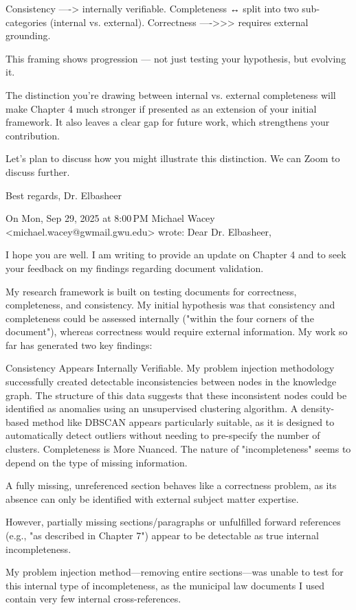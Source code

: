 Consistency ---->  internally verifiable.
Completeness ↔ split into two sub-categories (internal vs. external).
Correctness ---->>> requires external grounding.

This framing shows progression — not just testing your hypothesis, but evolving it.

The distinction you’re drawing between internal vs. external completeness will make Chapter 4 much stronger if presented as an extension of your initial framework. It also leaves a clear gap for future work, which strengthens your contribution.

Let’s plan to discuss how you might illustrate this distinction. We can Zoom to discuss further.

Best regards,
Dr. Elbasheer

On Mon, Sep 29, 2025 at 8:00 PM Michael Wacey <michael.wacey@gwmail.gwu.edu> wrote:
Dear Dr. Elbasheer,

I hope you are well. I am writing to provide an update on Chapter 4 and to seek your feedback on my findings regarding document validation.

My research framework is built on testing documents for correctness, completeness, and consistency. My initial hypothesis was that consistency and completeness could be assessed internally ("within the four corners of the document"), whereas correctness would require external information. My work so far has generated two key findings:

Consistency Appears Internally Verifiable. My problem injection methodology successfully created detectable inconsistencies between nodes in the knowledge graph. The structure of this data suggests that these inconsistent nodes could be identified as anomalies using an unsupervised clustering algorithm. A density-based method like DBSCAN appears particularly suitable, as it is designed to automatically detect outliers without needing to pre-specify the number of clusters.
Completeness is More Nuanced. The nature of "incompleteness" seems to depend on the type of missing information.

A fully missing, unreferenced section behaves like a correctness problem, as its absence can only be identified with external subject matter expertise.

However, partially missing sections/paragraphs or unfulfilled forward references (e.g., "as described in Chapter 7") appear to be detectable as true internal incompleteness.

My problem injection method—removing entire sections—was unable to test for this internal type of incompleteness, as the municipal law documents I used contain very few internal cross-references.

